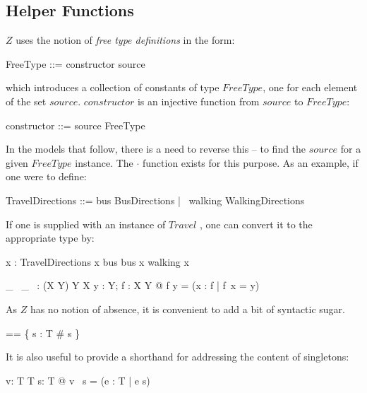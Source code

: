 \documentclass[fuzz]{llncs}
\def\entryFor{\cdot}
\begin{document}
\subsection{Helper Functions}
${Z}$ uses the notion of \textit{free type definitions} in the form: 
\begin{syntax}
FreeType ::= constructor \ldata source \rdata
\end{syntax}
which introduces a collection of constants of type $FreeType$, one for each element of the set $source$.  $constructor$ is an injective function from $source$ to $FreeType$:
\begin{syntax}
constructor ::= source \inj FreeType
\end{syntax}
In the models that follow, there is a need to reverse this -- to find the $source$ for a given $FreeType$ instance. The 
$\entryFor$ function exists for this purpose.  As an example, if one were to define:
\begin{syntax}
TravelDirections ::= bus \ldata BusDirections \rdata | \ walking \ldata WalkingDirections \rdata
\end{syntax}
If one is supplied with an instance of $Travel$ , one can convert it to the appropriate type by:
\begin{syntax}
x : TravelDirections
\where
\IF x \in \ran bus \THEN bus \entryFor x \ELSE walking \entryFor x
\end{syntax}

\begin{gendef}[X, Y]
    \_~  \entryFor \_~   : (X \inj Y) \cross Y \pfun X
   \where %
   \forall y : Y; f : X \inj Y @  f \entryFor y =
   (\mu x : \dom f | f~x = y)
\end{gendef}


As ${Z}$ has no notion of absence, it is convenient to add a bit of syntactic sugar. 
\begin{zed} 
  \optional[T] == \{ s : \power T \mid \# s  \} \\
\end{zed}

It is also useful to provide a shorthand for addressing the content of singletons:
\begin{gendef}[T]
   v: \power T \pfun T
\where
   \forall s: \power T @ v~ s = (\mu e : T | e \in s) 
\end{gendef}


\end{document}

